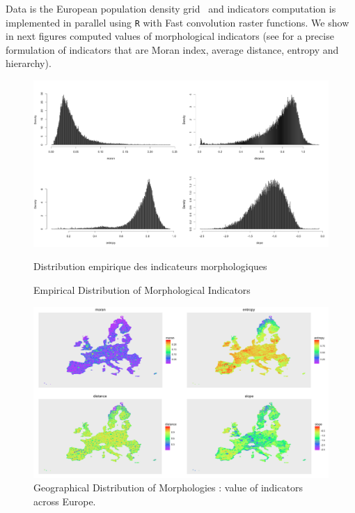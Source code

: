 
Data is the European population density grid~\cite{eurostat} 
 and indicators computation is implemented in parallel using \texttt{R} with Fast convolution raster functions. We show in next figures computed values of morphological indicators (see \cite{le2015forme} for a precise formulation of indicators that are Moran index, average distance, entropy and hierarchy). 



\begin{figure}
\includegraphics[width=1.2\textwidth]{Figures/Static/Density/hists_GOOD}
\caption[Empirical Distribution of Morphological Indicators]{Empirical Distribution of Morphological Indicators}{Distribution empirique des indicateurs morphologiques}
\end{figure}

\begin{figure}
\hspace{-5cm}
\includegraphics[angle=90,width=1.7\textwidth,height=\textheight]{Figures/Static/Density/all_50km}
\caption[Geographical Distribution of Morphologies]{Geographical Distribution of Morphologies : value of indicators across Europe.}{}
\end{figure}


